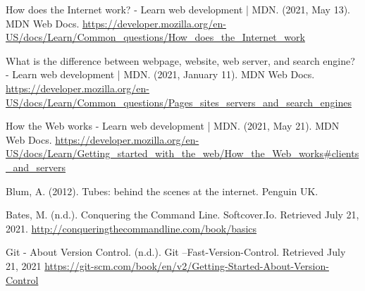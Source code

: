 \documentclass{article}
\begin{document}
	\begin{thebibliography}{9}
		How does the Internet work? - Learn web development | MDN. (2021, May 13). MDN Web Docs.
		\url{https://developer.mozilla.org/en-US/docs/Learn/Common_questions/How_does_the_Internet_work}
		
		What is the difference between webpage, website, web server, and search engine? - Learn web development | MDN. (2021, January 11). MDN Web Docs. \url{https://developer.mozilla.org/en-US/docs/Learn/Common_questions/Pages_sites_servers_and_search_engines}
		
		How the Web works - Learn web development | MDN. (2021, May 21). MDN Web Docs.
		\url{https://developer.mozilla.org/en-US/docs/Learn/Getting_started_with_the_web/How_the_Web_works#clients_and_servers}
		
		Blum, A. (2012). Tubes: behind the scenes at the internet. Penguin UK.
		
		Bates, M. (n.d.). Conquering the Command Line. Softcover.Io. Retrieved July 21, 2021.
		\url{http://conqueringthecommandline.com/book/basics}
		
		Git - About Version Control. (n.d.). Git --Fast-Version-Control. Retrieved July 21, 2021
		\url{https://git-scm.com/book/en/v2/Getting-Started-About-Version-Control}
		\end{thebibliography}
		
	
\end{document}
